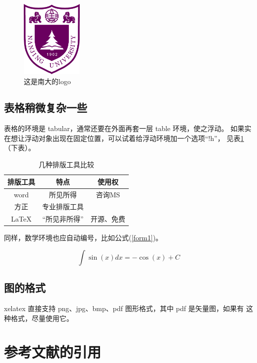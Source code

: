 \documentclass[12pt]{article}
\begin{document}
\begin{figure}
\centering   %
\includegraphics[width=3cm]{njulogo.pdf}
\caption{这是南大的logo} \label{njulogo}
\end{figure}

\subsection{表格稍微复杂一些}
表格的环境是 tabular，通常还要在外面再套一层 table 环境，使之浮动。
如果实在想让浮动对象出现在固定位置，可以试着给浮动环境加一个选项``!h''，
见表\ref{pub_tools}（下表）。

\begin{table}[!h]
\centering
\caption{几种排版工具比较}  \label{pub_tools}
\begin{tabular}{c|c|c}
    \hline
  排版工具 & 特点 & 使用权   \\ \hline
   word    & 所见所得 & 咨询MS \\
    方正    & 专业排版工具 &   \\
   LaTeX   &  ``所见非所得'' & 开源、免费\\ \hline
\end{tabular}
\end{table}

同样，数学环境也应自动编号，比如公式(\ref{form1})。

\begin{equation} \label{form1}
    \int \sin(x) dx = -\cos(x) + C
\end{equation}

\subsection{图的格式}
 xelatex 直接支持 png、jpg、bmp、pdf 图形格式，其中 pdf 是矢量图，如果有
 这种格式，尽量使用它。
 
\section{参考文献的引用}
\end{document}

